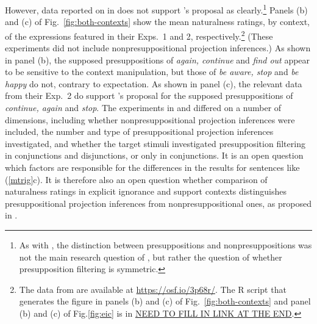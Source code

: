 \documentclass[11pt,fleqn]{article}
\newcommand{\6}{\mbox{$[\hspace*{-.6mm}[$}}
\newcommand{\9}{\mbox{$]\hspace*{-.6mm}]$}}
\newcommand{\citepos}[1]{\citeauthor{#1}'s \citeyear{#1}}
\begin{document}
However, data reported on in \citealt{kalomoiros-schwarz2024} does not support \citepos{mandelkern-etal2020} proposal as clearly.\footnote{As with \citealt{mandelkern-etal2020}, the distinction between presuppositions and nonpresuppositions was not the main research question of \citealt{kalomoiros-schwarz2024}, but rather the question of whether presupposition filtering is symmetric.} Panels (b) and (c) of Fig.~\ref{fig:both-contexts} show the mean naturalness ratings, by context, of the expressions featured in their Exps.~1 and 2, respectively.\footnote{The data from \citealt{kalomoiros-schwarz2024} are available at \url{https://osf.io/3p68r/}. The R script that generates the figure in panels (b) and (c) of Fig.~\ref{fig:both-contexts} and panel (b) and (c) of Fig.\ref{fig:eic} is in \url{NEED TO FILL IN LINK AT THE END}.} (These experiments did not include nonpresuppositional projection inferences.) As shown in panel (b), the supposed presuppositions of \emph{again, continue} and \emph{find out} appear to be sensitive to the context manipulation, but those of \emph{be aware, stop} and \emph{be happy} do not, contrary to expectation. As shown in panel (c), the relevant data from their Exp.~2 do support \citepos{mandelkern-etal2020} proposal for the supposed presuppositions of \emph{continue, again} and \emph{stop}. The experiments in \citealt{mandelkern-etal2020} and \citealt{kalomoiros-schwarz2024} differed on a number of dimensions, including whether nonpresuppositional projection inferences were included, the number and type of presuppositional projection inferences investigated, and whether the target stimuli investigated presupposition filtering in conjunctions and disjunctions, or only in conjunctions. It is an open question which factors are responsible for the differences in the results for sentences like (\ref{mtrig}c). It is therefore also an open question whether comparison of naturalness ratings in explicit ignorance and support contexts distinguishes presuppositional projection inferences from nonpresuppositional ones, as proposed in \citealt{mandelkern-etal2020}.
\end{document}
